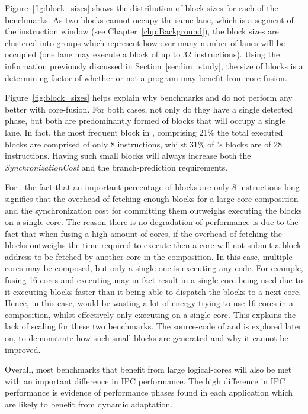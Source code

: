 Figure~\ref{fig:block_sizes} shows the distribution of block-sizes for each of the benchmarks.
As two blocks cannot occupy the same lane, which is a segment of the instruction window (see Chapter~\ref{chp:Background}), the block sizes are clustered into groups which represent how ever many number of lanes will be occupied (one lane may execute a block of up to 32 instructions).
Using the information previously discussed in Section~\ref{sec:lim_study}, the size of blocks is a determining factor of whether or not a program may benefit from core fusion.

Figure~\ref{fig:block_sizes} helps explain why benchmarks  and  do not perform any better with core-fusion.
For both cases, not only do they have a single detected phase, but both are predominantly formed of blocks that will occupy a single lane.
In fact, the most frequent block in , comprising 21\% the total executed blocks are comprised of only 8 instructions, whilst 31\% of 's blocks are of 28 instructions.
Having such small blocks will always increase both the \textit{SynchronizationCost} and the branch-prediction requirements.

For , the fact that an important percentage of blocks are only 8 instructions long signifies that the overhead of fetching enough blocks for a large core-composition and the synchronization cost for committing them outweighs executing the blocks on a single core.
The reason there is no degradation of performance is due to the fact that when fusing a high amount of cores, if the overhead of fetching the blocks outweighs the time required to execute then a core will not submit a block address to be fetched by another core in the composition.
In this case, multiple cores may be composed, but only a single one is executing any code.
For example, fusing 16 cores and executing  may in fact result in a single core being used due to it executing blocks faster than it being able to dispatch the blocks to a next core.
Hence, in this case,  would be wasting a lot of energy trying to use 16 cores in a composition, whilst effectively only executing on a single core. 
This explains the lack of scaling for these two benchmarks.
The source-code of  and  is explored later on, to demonstrate how such small blocks are generated and why it cannot be improved.

Overall, most benchmarks that benefit from large logical-cores will also be met with an important difference in IPC performance.
The high difference in IPC performance is evidence of performance phases found in each application which are likely to benefit from dynamic adaptation.

